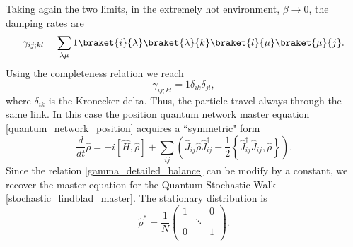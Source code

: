 Taking again the two limits, in the extremely hot environment, $\beta \rightarrow 0$, the damping rates are
\begin{equation}
    \gamma_{ij;kl}= \sum_{\lambda\mu} 1 \braket{i}{\lambda}\braket{\lambda}{k}\braket{l}{\mu}\braket{\mu}{j}.
\end{equation}
Using the completeness relation we reach
\begin{equation}
    \gamma_{ij;kl} = 1 \delta_{ik}\delta_{jl},
\end{equation}
where $\delta_{ik}$ is the Kronecker delta. Thus, the particle travel always through the same link.
In this case the position quantum network master equation \eqref{quantum_network_position} acquires a “symmetric" form
\begin{equation}
    \frac{d}{dt}\hat\rho = -i\left[\hat H,\hat\rho\right] +\sum_{ij}\left(\hat J_{ij}\hat\rho \hat J_{ij}^\dagger - \frac{1}{2}\left\{ \hat J_{ij}^\dagger\hat J_{ij}, \hat\rho\right\} \right).
\end{equation}
Since the relation \eqref{gamma_detailed_balance} can be modify by a constant, we recover the master equation for the Quantum Stochastic Walk \eqref{stochastic_lindblad_master}.
The stationary distribution is 
\begin{equation}
    \hat\rho^* = \frac{1}{N}\begin{pmatrix}
        1&&0\\
        &\ddots&\\
        0&&1\\
    \end{pmatrix}.
\end{equation}


